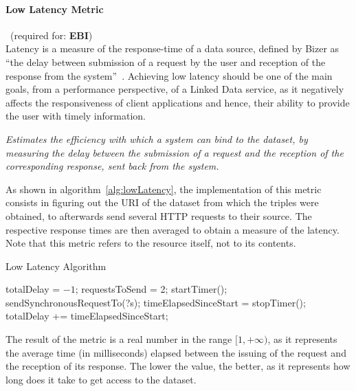 \paragraph{Low Latency Metric}~(required for: \textbf{EBI}) ~\\ %
Latency is a measure of the response-time of a data source, defined by Bizer as ``the delay between submission of a request by the user and reception of the response from the system''~\cite{Bizer2008:PhDThesis:biblatex}. Achieving low latency should be one of the main goals, from a performance perspective, of a Linked Data service, as it negatively affects the responsiveness of client applications and hence, their ability to provide the user with timely information.
\begin{mdframed}[style=metricdefinition]
\emph{Estimates the efficiency with which a system can bind to the dataset, by measuring the delay between the submission of a request  and the reception of the corresponding response, sent back from the system.}
\end{mdframed}

As shown in algorithm~\ref{alg:lowLatency}, the implementation of this metric consists in figuring out the URI of the dataset from which the triples were obtained, to afterwards send several HTTP requests to their source. The respective response times are then averaged to obtain a measure of the latency. Note that this metric refers to the resource itself, not to its contents.
\begin{algorithm}
\caption{Low Latency Algorithm} \label{alg:lowLatency}
\begin{algorithmic}[1]
\State totalDelay = $-1$;
\State requestsToSend = 2;
\EndProcedure
{}
\State startTimer();
\State sendSynchronousRequestTo(?s);
\EndFor
\State timeElapsedSinceStart = stopTimer();
\State totalDelay += timeElapsedSinceStart;
\EndIf
{}
\EndProcedure
\end{algorithmic}
\end{algorithm}
The result of the metric is a real number in the range $[1, +\infty)$, as it represents the average time (in  milliseconds) elapsed between the issuing of the request and the reception of its response. The lower the value, the better, as it represents how long does it take to get access to the dataset.

